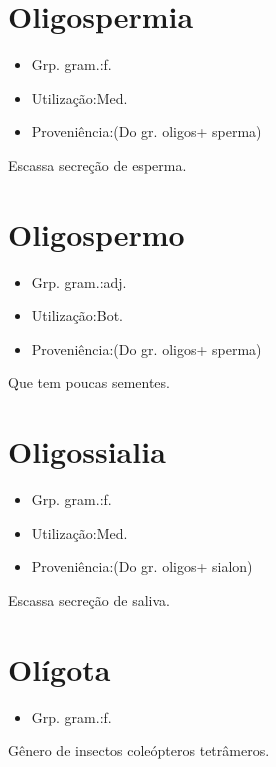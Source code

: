 \section{Oligospermia}
\begin{itemize}
\item {Grp. gram.:f.}
\end{itemize}
\begin{itemize}
\item {Utilização:Med.}
\end{itemize}
\begin{itemize}
\item {Proveniência:(Do gr. \textunderscore oligos\textunderscore  + \textunderscore sperma\textunderscore )}
\end{itemize}
Escassa secreção de esperma.
\section{Oligospermo}
\begin{itemize}
\item {Grp. gram.:adj.}
\end{itemize}
\begin{itemize}
\item {Utilização:Bot.}
\end{itemize}
\begin{itemize}
\item {Proveniência:(Do gr. \textunderscore oligos\textunderscore  + \textunderscore sperma\textunderscore )}
\end{itemize}
Que tem poucas sementes.
\section{Oligossialia}
\begin{itemize}
\item {Grp. gram.:f.}
\end{itemize}
\begin{itemize}
\item {Utilização:Med.}
\end{itemize}
\begin{itemize}
\item {Proveniência:(Do gr. \textunderscore oligos\textunderscore  + \textunderscore sialon\textunderscore )}
\end{itemize}
Escassa secreção de saliva.
\section{Olígota}
\begin{itemize}
\item {Grp. gram.:f.}
\end{itemize}
Gênero de insectos coleópteros tetrâmeros.
